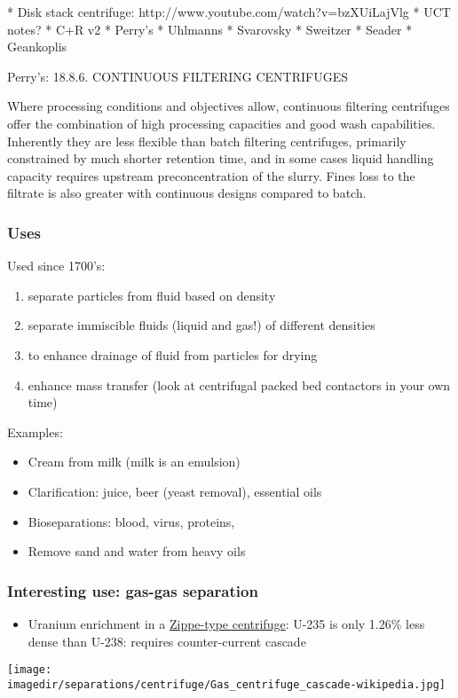 






* Disk stack centrifuge: http://www.youtube.com/watch?v=bzXUiLajVlg
* UCT notes?
* C+R v2
* Perry's
* Uhlmanns
* Svarovsky
* Sweitzer
* Seader
* Geankoplis	


Perry's: 18.8.6. CONTINUOUS FILTERING CENTRIFUGES

Where processing conditions and objectives allow, continuous filtering centrifuges offer the combination of high processing capacities and good wash capabilities. Inherently they are less flexible than batch filtering centrifuges, primarily constrained by much shorter retention time, and in some cases liquid handling capacity requires upstream preconcentration of the slurry. Fines loss to the filtrate is also greater with continuous designs compared to batch.

\begin{frame}\frametitle{Uses}
	Used since 1700's:
	\begin{enumerate}
		\item	separate particles from fluid based on density
		\item	separate immiscible fluids (liquid and gas!) of different densities
		\item	to enhance drainage of fluid from particles for drying
		\item	enhance mass transfer (look at centrifugal packed bed contactors in your own time)
	\end{enumerate}
	
	\vspace{12pt}
	Examples:
	\begin{itemize}
		\item	Cream from milk (milk is an emulsion)
		\item	Clarification: juice, beer (yeast removal), essential oils
		\item	Bioseparations: blood, virus, proteins, 
		\item	Remove sand and water from heavy oils
	\end{itemize}
\end{frame}

\begin{frame}\frametitle{Interesting use: gas-gas separation}
	\begin{itemize}
		\item	\small Uranium enrichment in a \href{http://en.wikipedia.org/wiki/Zippe-type_centrifuge}{Zippe-type centrifuge}:  U-235 is only 1.26\% less dense than U-238: requires counter-current cascade
	\end{itemize}
	\begin{center}
		\texttt{[image: \\imagedir/separations/centrifuge/Gas\_centrifuge\_cascade-wikipedia.jpg]}
	\end{center}
	\vspace{-12pt}
\end{frame}

